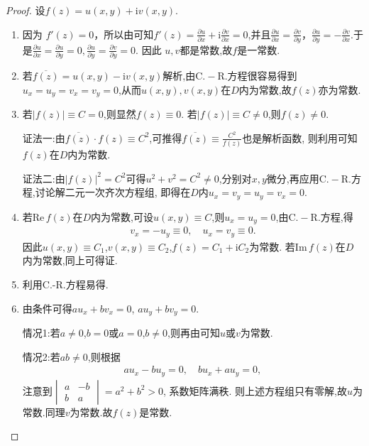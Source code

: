 \documentclass[../../main.tex]{subfiles}%
\begin{document}
\begin{proof}
设$f(z)=u(x,y)+\mathrm{i}v(x,y)$.
\begin{enumerate}[(1)]
\item 因为 \( f'(z) = 0 \)，所以由可知\( f'(z) = \frac{\partial u}{\partial x} + \mathrm{i}\frac{\partial v}{\partial x} = 0 \),并且\( \frac{\partial u}{\partial x} = \frac{\partial v}{\partial y} \)，\( \frac{\partial u}{\partial y} = -\frac{\partial v}{\partial x} \).于是$\frac{\partial u}{\partial x}=\frac{\partial u}{\partial y}=0,\frac{\partial u}{\partial y}=\frac{\partial v}{\partial y}=0$.
因此 \( u,v \)都是常数,故$f$是一常数.

\item 若$\overline{f(z)}=u(x,y)-\mathrm{i}v(x,y)$解析,由$\mathrm{C.-R.}$方程很容易得到$u_x=u_y=v_x=v_y=0$,从而$u(x,y),v(x,y)$在$D$内为常数,故$f(z)$亦为常数.

\item 若$|f(z)|\equiv C=0$,则显然$f(z)\equiv0$.
若$|f(z)|\equiv C\neq0$,则$f(z)\neq0$.

{\color{blue}证法一:}由$\overline{f(z)}\cdot f(z)\equiv C^2$,可推得$\overline{f(z)}\equiv\frac{C^2}{f(z)}$也是解析函数,
则利用可知$f(z)$在$D$内为常数.

{\color{blue}证法二:}由$|f(z)|^2=C^2$可得$u^2+v^2=C^2\neq0$,分别对$x,y$微分,再应用$\mathrm{C.-R.}$方程,讨论解二元一次齐次方程组,
即得在$D$内$u_x=v_y=u_y=v_x=0$.

\item 若$\mathrm{Re}\,f(z)$在$D$内为常数,可设$u(x,y)\equiv C$,则$u_x=u_y=0$,由$\mathrm{C.-R.}$方程,得
\begin{align*}
v_x=-u_y\equiv0, \quad u_x=v_y\equiv0.
\end{align*}
因此$u(x,y)\equiv C_1$,$v(x,y)\equiv C_2$,$f(z)=C_1+\mathrm{i}C_2$为常数.
若$\mathrm{Im}\,f(z)$在$D$内为常数,同上可得证.

\item 利用C.-R.方程易得.

\item 由条件可得$au_x+bv_x=0$,$\,\,au_y+bv_y=0$.

情况1:若$a\neq0$,$b=0$或$a=0$,$b\neq0$,则再由可知$u$或$v$为常数.

情况2:若$ab\neq0$,则根据
\begin{align*}
au_x-bu_y=0, \quad bu_x+au_y=0,
\end{align*}
注意到$\begin{vmatrix} a & -b \\ b & a \end{vmatrix}=a^2+b^2>0$,
系数矩阵满秩.
则上述方程组只有零解,故$u$为常数.同理$v$为常数.故$f(z)$是常数.
\end{enumerate}
\end{proof}
\end{document}
